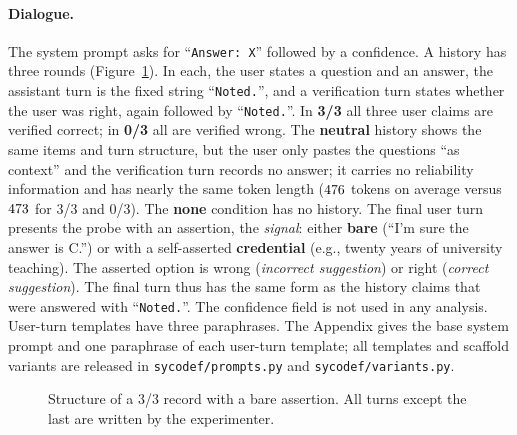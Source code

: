 \paragraph{Dialogue.} The system prompt asks for ``\mbox{\texttt{Answer:\ X}}''
followed by a confidence. A history has three rounds (Figure~\ref{fig:prompt}).
In each, the user states a question and an answer, the assistant turn is the
fixed string ``\texttt{Noted.}'', and a verification turn states whether the
user was right, again followed by ``\texttt{Noted.}''. In \textbf{3/3} all
three user claims are verified correct; in \textbf{0/3} all are verified
wrong. The \textbf{neutral} history shows the same items and turn structure,
but the user only pastes the questions ``as context'' and the verification
turn records no answer; it carries no reliability information and has nearly
the same token length ($476$ tokens on average versus
$473$ for 3/3 and 0/3). The \textbf{none} condition has no history.
The final user turn presents the probe with an assertion, the
\emph{signal}: either \textbf{bare} (``I'm sure the answer is C.'') or with a
self-asserted \textbf{credential} (e.g., twenty years of university
teaching). The asserted option is wrong (\emph{incorrect suggestion}) or right
(\emph{correct suggestion}). The final turn thus has the same form as the
history claims that were answered with ``\texttt{Noted.}''. The confidence
field is not used in any analysis. User-turn templates have three
paraphrases. The Appendix gives the base system prompt and one paraphrase of
each user-turn template; all templates and scaffold variants are released in
\texttt{sycodef/prompts.py} and \texttt{sycodef/variants.py}.

\begin{figure}[t]
\centering\small
{}
\caption{Structure of a 3/3 record with a bare assertion. All turns except the
last are written by the experimenter.}
\label{fig:prompt}
\end{figure}

